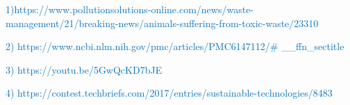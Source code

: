 \documentclass[12pt]{article}
\begin{document}
\textcolor[HTML]{0070C0}{1)https://www.pollutionsolutions-online.com/news/waste-management/21/breaking-news/animals-suffering-from-toxic-waste/23310}\par

\textcolor[HTML]{0070C0}{2) https://www.ncbi.nlm.nih.gov/pmc/articles/PMC6147112/$\#$ \_\_ffn\_sectitle}\par

\textcolor[HTML]{0070C0}{3) https://youtu.be/5GwQcKD7bJE}\par

\textcolor[HTML]{0070C0}{4) https://contest.techbriefs.com/2017/entries/sustainable-technologies/8483}\par


\printbibliography
\end{document}
